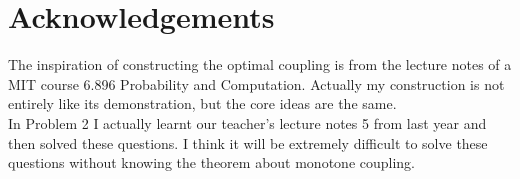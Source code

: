\documentclass[12pt,letterpaper]{article}
\begin{document}
\newpage
\section*{Acknowledgements}
The inspiration of constructing the optimal coupling is from the lecture notes of a MIT course 6.896 Probability and Computation. Actually my construction is not entirely like its demonstration, but the core ideas are the same.\\
In Problem 2 I actually learnt our teacher's lecture notes 5 from last year and then solved these questions. I think it will be extremely difficult to solve these questions without knowing the theorem about monotone coupling.
\end{document}
